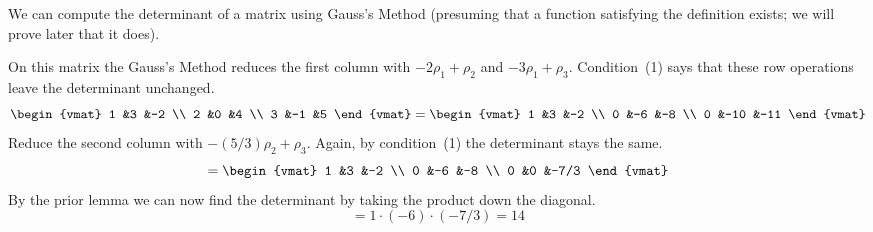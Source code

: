 \documentclass[10pt,t]{beamer}
\begin{document}
\begin{frame}
We can compute the determinant of a matrix using Gauss's Method
(presuming that a function satisfying the definition exists; 
we will prove later that it does).

\ex  On this matrix the Gauss's Method reduces the first column  with 
$-2\rho_1+\rho_2$ and $-3\rho_1+\rho_3$.
Condition~(1) says that these row operations
leave the determinant unchanged.
\begin{equation*}
  \begin{vmat}
    1  &3  &-2 \\
    2  &0  &4  \\
    3  &-1 &5
  \end{vmat}
  =
  \begin{vmat}
    1  &3   &-2 \\
    0  &-6  &-8  \\
    0  &-10 &-11
  \end{vmat}
\end{equation*}
\pause
Reduce the second column with $-(5/3)\rho_2+\rho_3$.
Again, by condition~(1) the determinant stays the same.
\begin{equation*}
  =
  \begin{vmat}
    1  &3   &-2 \\
    0  &-6  &-8  \\
    0  &0   &-7/3
  \end{vmat}
\end{equation*}
\pause
By the prior lemma we can now 
find the determinant by taking the product down the
diagonal.
\begin{equation*}
  =1\cdot(-6)\cdot(-7/3)=14
\end{equation*}
\end{frame}
\end{document}
